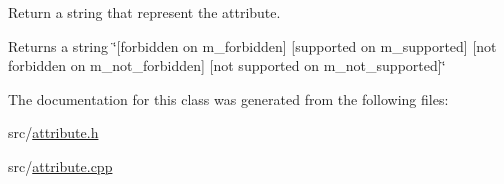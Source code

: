 Return a string that represent the attribute. 

\begin{DoxyReturn}{Returns}
a string \char`\"{}\mbox{[}forbidden on m\+\_\+forbidden\mbox{]} \mbox{[}supported on m\+\_\+supported\mbox{]} \mbox{[}not forbidden on m\+\_\+not\+\_\+forbidden\mbox{]} \mbox{[}not supported on m\+\_\+not\+\_\+supported\mbox{]}\char`\"{} 
\end{DoxyReturn}


The documentation for this class was generated from the following files\+:\begin{DoxyCompactItemize}
\item 
src/\hyperlink{attribute_8h}{attribute.\+h}\item 
src/\hyperlink{attribute_8cpp}{attribute.\+cpp}\end{DoxyCompactItemize}
